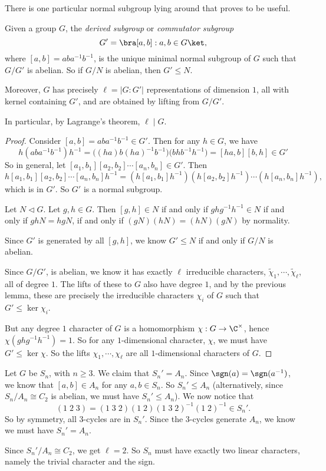 \documentclass[a4paper]{article}
\begin{document}
There is one particular normal subgroup lying around that proves to be useful.

\begin{lemma}
  Given a group $G$, the \emph{derived subgroup} or \emph{commutator subgroup}
  \[
    G' = \bra [a, b]: a, b \in G\ket,
  \]
  where $[a, b] = aba^{-1}b^{-1}$, is the unique minimal normal subgroup of $G$ such that $G/G'$ is abelian. So if $G/N$ is abelian, then $G' \leq N$.

  Moreover, $G$ has precisely $\ell = |G:G'|$ representations of dimension $1$, all with kernel containing $G'$, and are obtained by lifting from $G/G'$.

  In particular, by Lagrange's theorem, $\ell \mid G$.
\end{lemma}

\begin{proof}
  Consider $[a, b] = aba^{-1}b^{-1} \in G'$. Then for any $h \in G$, we have
  \[
    h(aba^{-1}b^{-1})h^{-1} = \Big((ha)b (ha)^{-1} b^{-1}\Big) \Big(bhb^{-1}h^{-1}\Big) = [ha, b][b, h]\in G'
  \]
  So in general, let $[a_1, b_1][a_2, b_2]\cdots[a_n, b_n] \in G'$. Then
  \[
    h [a_1, b_1][a_2, b_2]\cdots[a_n, b_n] h^{-1} = (h [a_1, b_1]h^{-1})(h [a_2, b_2] h^{-1}) \cdots (h[a_n, b_n]h^{-1}),
  \]
  which is in $G'$. So $G'$ is a normal subgroup.

  Let $N \lhd G$. Let $g, h \in G$. Then $[g, h] \in N$ if and only if $ghg^{-1}h^{-1} \in N$ if and only if $gh N = hg N$, if and only if $(gN)(hN) = (hN)(gN)$ by normality.

  Since $G'$ is generated by all $[g, h]$, we know $G' \leq N$ if and only if $G/N$ is abelian.

  Since $G/G'$, is abelian, we know it has exactly $\ell$ irreducible characters, $\tilde{\chi}_1, \cdots, \tilde{\chi}_{\ell}$, all of degree $1$. The lifts of these to $G$ also have degree $1$, and by the previous lemma, these are precisely the irreducible characters $\chi_i$ of $G$ such that $G' \leq \ker \chi_i$.

  But any degree $1$ character of $G$ is a homomorphism $\chi: G \to \C^\times$, hence $\chi(ghg^{-1}h^{-1}) = 1$. So for any $1$-dimensional character, $\chi$, we must have $G' \leq \ker \chi$. So the lifts $\chi_1, \cdots, \chi_\ell$ are all $1$-dimensional characters of $G$.
\end{proof}

\begin{eg}
  Let $G$ be $S_n$, with $n \geq 3$. We claim that $S_n' = A_n$. Since $\sgn(a) = \sgn(a^{-1})$, we know that $[a, b] \in A_n$ for any $a, b \in S_n$. So $S_n' \leq A_n$ (alternatively, since $S_n / A_n \cong C_2$ is abelian, we must have $S_n' \leq A_n$). We now notice that
   \[
    (1\; 2\; 3) = (1\; 3\; 2) (1\; 2) (1\; 3\; 2)^{-1} (1\; 2)^{-1} \in S_n'.
  \]
  So by symmetry, all $3$-cycles are in $S_n'$. Since the $3$-cycles generate $A_n$, we know we must have $S_n' = A_n$.

  Since $S_n'/A_n \cong C_2$, we get $\ell = 2$. So $S_n$ must have exactly two linear characters, namely the trivial character and the sign.
\end{eg}
\end{document}
